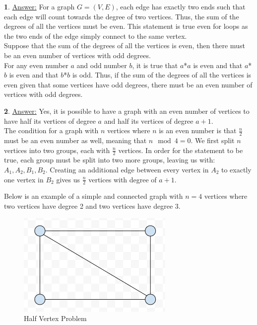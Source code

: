 \documentclass[12pt,a4paper]{article}
\theoremstyle{definition}
\newtheorem{problem}{}
\begin{document}
\begin{problem}
\underline{Answer:} For a graph $G = (V, E)$, each edge has exactly two ends such that each edge will count towards the degree of two vertices. Thus, the sum of the degrees of all the vertices must be even. This statement is true even for loops as the two ends of the edge simply connect to the same vertex. \\

Suppose that the sum of the degrees of all the vertices is even, then there must be an even number of vertices with odd degrees. \\

For any even number $a$ and odd number $b$, it is true that $a$*$a$ is even and that $a$*$b$ is even and that $b$*$b$ is odd. Thus, if the sum of the degrees of all the vertices is even given that some vertices have odd degrees, there must be an even number of vertices with odd degrees.

\end{problem}

\begin{problem}
\underline{Answer:} Yes, it is possible to have a graph with an even number of vertices to have half its vertices of degree $a$ and half its vertices of degree $a + 1$. \\

The condition for a graph with $n$ vertices where $n$ is an even number is that $\frac{n}{2}$ must be an even number as well, meaning that $n \mod 4 = 0$. We first split $n$ vertices into two groups, each with $\frac{n}{2}$ vertices. In order for the statement to be true, each group must be split into two more groups, leaving us with: $A_1, A_2, B_1, B_2$. Creating an additional edge between every vertex in $A_2$ to exactly one vertex in $B_2$ gives us $\frac{n}{2}$ vertices with degree of $a + 1$. 

Below is an example of a simple and connected graph with $n = 4$ vertices where two vertices have degree 2 and two vertices have degree 3. \\

\begin{figure}[H]
    \centering
    \includegraphics[scale=0.6]{q3.png}
    \caption{Half Vertex Problem}
    \label{fig:my_label}
\end{figure}

\end{problem}
\end{document}
